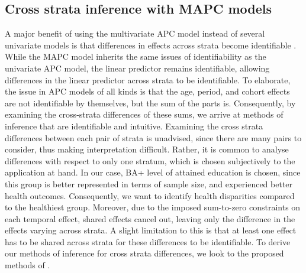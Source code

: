 \subsection{Cross strata inference with MAPC models}
\label{section:APC-inference}
A major benefit of using the multivariate APC model instead of several univariate models is that differences in effects across strata become identifiable \citep{APC-Bayesian-Andrea}. While the MAPC model inherits the same issues of identifiability as the univariate APC model, the linear predictor remains identifiable, allowing differences in the linear predictor across strata to be identifiable. To elaborate, the issue in APC models of all kinds is that the age, period, and cohort effects are not identifiable by themselves, but the sum of the parts is. Consequently, by examining the cross-strata differences of these sums, we arrive at methods of inference that are identifiable and intuitive. Examining the cross strata differences between each pair of strata is unadvised, since there are many pairs to consider, thus making interpretation difficult. Rather, it is common to analyse differences with respect to only one stratum, which is chosen subjectively to the application at hand. In our case, BA+ level of attained education is chosen, since this group is better represented in terms of sample size, and experienced better health outcomes. Consequently, we want to identify health disparities compared to the healthiest group. Moreover, due to the imposed sum-to-zero constraints on each temporal effect, shared effects cancel out, leaving only the difference in the effects varying across strata. A slight limitation to this is that at least one effect has to be shared across strata for these differences to be identifiable. To derive our methods of inference for cross strata differences, we look to the proposed methods of \cite{APC-Bayesian-Andrea}.

